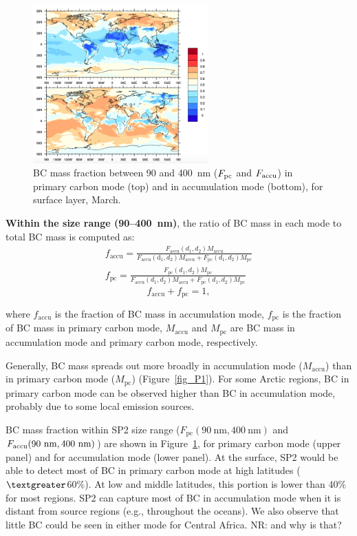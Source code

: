 \documentclass[11pt]{article}
\newcommand{\nrtodo}[1]{{\color{blue} NR: #1}}
\begin{document}
\begin{figure}[!h] 
	\begin{center}
		\includegraphics[width = 0.6\textwidth]{Rplot02}
		\caption[]{\label{fig_P2} BC mass fraction between 90 and 400~nm ($F_{\rm pc}$ and $F_{\rm accu}$) in primary carbon mode (top) and in accumulation mode (bottom), for surface layer, March.}
	\end{center}
\end{figure}


\textbf{Within the size range (90--400~nm)}, the ratio of BC mass in each mode to total BC mass is computed as:
\begin{align*}
f_{\text{accu}} = \frac{F_{\text{accu}}(d_{1}, d_{2})M_{\text{accu}}}{F_{\text{accu}}(\text{d}_{1}, d_{2})M_{\text{accu}}+F_{\text{pc}}(d_{1}, d_{2})M_{\text{pc}}}\\
f_{\text{pc}} = \frac{F_{\text{pc}}(d_{1}, d_{2})M_{\text{pc}}}{F_{\text{accu}}(d_{1}, d_{2})M_{\text{accu}}+F_{\text{pc}}(d_{1}, d_{2})M_{\text{pc}}}
\end{align*}
\[f_{\text{accu}} + f_{\text{pc}} = 1,\]

where $f_{\text{accu}}$ is the fraction of BC mass in
accumulation mode, $f_{\text{pc}}$ is the fraction of BC mass in
primary carbon mode, $M_{\text{accu}}$ and $M_{\text{pc}}$ are BC mass
in accumulation mode and primary carbon mode, respectively.

Generally, BC mass spreads out more broadly in accumulation mode ($M_{\text{accu}}$) than in primary carbon mode ($M_{\text{pc}}$) (Figure~\ref{fig_P1}). For some Arctic regions, BC in primary carbon mode can be observed higher than BC in accumulation mode, probably due to some local emission sources.

BC mass fraction within SP2 size range ($F_{\text{pc}}(90~\text{nm}, 400~\text{nm})$ and
$F_{\text{accu}}(90~\rm nm, 400~\rm nm)$) are shown in Figure~\ref{fig_P2}, for primary carbon mode
(upper panel) and for accumulation mode (lower panel). At the surface,
SP2 would be able to detect most of BC in primary
carbon mode at high latitudes ($\textgreater$60$\%$).  At low and
middle latitudes, this portion is lower than 40$\%$ for most
regions. SP2 can capture most of BC in accumulation mode when it is
distant from source regions (e.g., throughout the oceans). We also
observe that little BC could be seen in either mode for Central
Africa. \nrtodo{and why is that?} 
\end{document}

